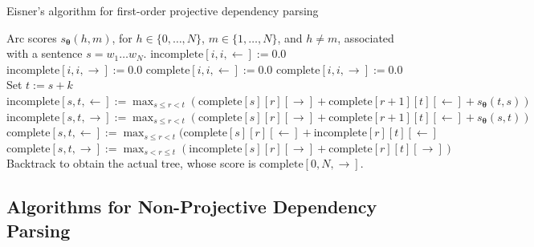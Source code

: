 \begin{algorithm}[h!]
   \caption{Eisner's algorithm for first-order projective dependency parsing\label{alg:eisner}}
\begin{algorithmic}[1]
    Arc scores $s_{\boldsymbol{\theta}}(h,m)$, for $h \in \{0,\ldots,N\}$, 
   $m \in \{1,\ldots,N\}$, and $h \ne m$, associated with a sentence $s=w_1\ldots w_N$.
   \STATE {}
	\STATE {}
	\STATE $\mathrm{incomplete}[i,i,\leftarrow] := 0.0$
	\STATE $\mathrm{incomplete}[i,i,\rightarrow] := 0.0$
	\STATE
	\STATE {}
	\STATE $\mathrm{complete}[i,i,\leftarrow] := 0.0$
	\STATE $\mathrm{complete}[i,i,\rightarrow] := 0.0$
	\ENDFOR
	\STATE
	\STATE {}
	\STATE Set $t := s + k$ 
	\STATE
	\STATE {}
	\STATE $\mathrm{incomplete}[s,t,\leftarrow] := \max_{s \le r < t} (\mathrm{complete}[s][r][\rightarrow] + \mathrm{complete}[r+1][t][\leftarrow] + s_{\boldsymbol{\theta}}(t,s)) $
	\STATE $\mathrm{incomplete}[s,t,\rightarrow] := \max_{s \le r < t} (\mathrm{complete}[s][r][\rightarrow] + \mathrm{complete}[r+1][t][\leftarrow] + s_{\boldsymbol{\theta}}(s,t))$
	\STATE
	\STATE {}
	\STATE $\mathrm{complete}[s,t,\leftarrow] := \max_{s \le r < t} (\mathrm{complete}[s][r][\leftarrow] + \mathrm{incomplete}[r][t][\leftarrow]$
	\STATE $\mathrm{complete}[s,t,\rightarrow] := \max_{s < r \le t} (\mathrm{incomplete}[s][r][\rightarrow] + \mathrm{complete}[r][t][\rightarrow])$
	\ENDFOR
	\ENDFOR
	\STATE
	\STATE {}
	\STATE Backtrack to obtain the actual tree, whose score is $\mathrm{complete}[0,N,\rightarrow]$.
\end{algorithmic}
\end{algorithm}


\subsection{Algorithms for Non-Projective Dependency Parsing}

